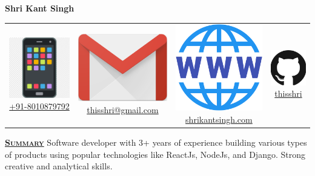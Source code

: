 \documentclass[11pt, a4paper]{article}
\begin{document}
\begin{center}
    \textbf{{\huge Shri Kant Singh}}
\end{center}
\begin{center}
    \begin{tabular}{ c | c | c | c}
        \includegraphics[height=.018\textwidth]{phone} \href{tel:+918010879792}{+91-8010879792} &
        \includegraphics[height=.018\textwidth]{gmail} \href{mailto:thisshri@gmail.com} {thisshri@gmail.com} &
        \includegraphics[height=.018\textwidth]{web} \href{https://shrikantsingh.com} {shrikantsingh.com}&
        \includegraphics[height=.018\textwidth]{github} \href{https://github.com/thisshri} {thisshri} \\
    \end{tabular}
\end{center}

\begin{flushleft}
    \uline{\textsc{\large{\textbf{Summary}}}\hfill}
    \newline
    \newline
    Software developer with 3+ years of experience building various types of products using popular technologies like ReactJs, NodeJs, and Django. Strong creative and analytical skills.
\end{flushleft}
\end{document}
